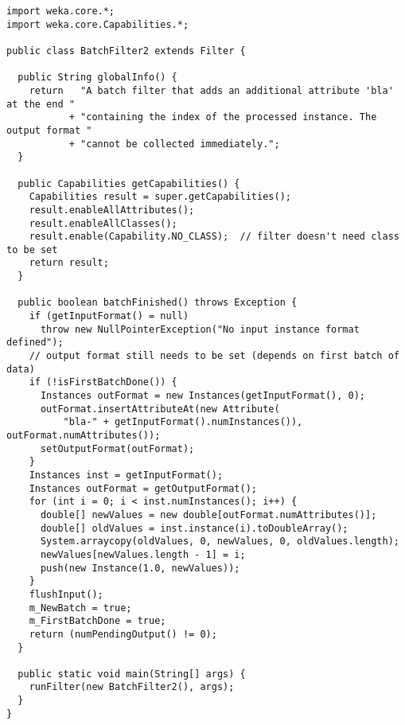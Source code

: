 
\begin{verbatim}
import weka.core.*;
import weka.core.Capabilities.*;

public class BatchFilter2 extends Filter {

  public String globalInfo() {
    return   "A batch filter that adds an additional attribute 'bla' at the end "
           + "containing the index of the processed instance. The output format "
           + "cannot be collected immediately.";
  }

  public Capabilities getCapabilities() {
    Capabilities result = super.getCapabilities();
    result.enableAllAttributes();
    result.enableAllClasses();
    result.enable(Capability.NO_CLASS);  // filter doesn't need class to be set
    return result;
  }

  public boolean batchFinished() throws Exception {
    if (getInputFormat() = null)
      throw new NullPointerException("No input instance format defined");
    // output format still needs to be set (depends on first batch of data)
    if (!isFirstBatchDone()) {
      Instances outFormat = new Instances(getInputFormat(), 0);
      outFormat.insertAttributeAt(new Attribute(
          "bla-" + getInputFormat().numInstances()), outFormat.numAttributes());
      setOutputFormat(outFormat);
    }
    Instances inst = getInputFormat();
    Instances outFormat = getOutputFormat();
    for (int i = 0; i < inst.numInstances(); i++) {
      double[] newValues = new double[outFormat.numAttributes()];
      double[] oldValues = inst.instance(i).toDoubleArray();
      System.arraycopy(oldValues, 0, newValues, 0, oldValues.length);
      newValues[newValues.length - 1] = i;
      push(new Instance(1.0, newValues));
    }
    flushInput();
    m_NewBatch = true;
    m_FirstBatchDone = true;
    return (numPendingOutput() != 0);
  }

  public static void main(String[] args) {
    runFilter(new BatchFilter2(), args);
  }
}
\end{verbatim}
